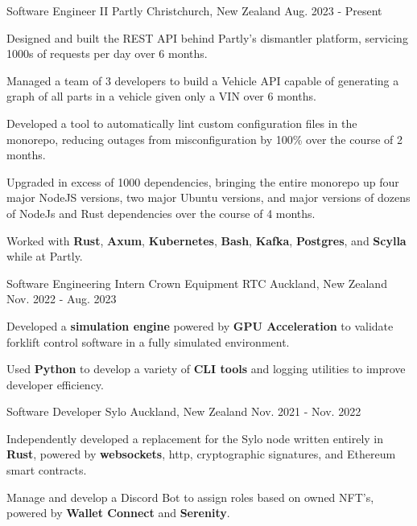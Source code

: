 
\begin{cventries}
  \cventry
    {Software Engineer II}
    {Partly}
    {Christchurch, New Zealand}
    {Aug. 2023 - Present}
    {
      \begin{cvitems}
        \item {Designed and built the REST API behind Partly's dismantler platform, servicing 1000s of requests per day over 6 months.}
        \item {Managed a team of 3 developers to build a Vehicle API capable of generating a graph of all parts in a vehicle given only a VIN over 6 months.}
        \item {Developed a tool to automatically lint custom configuration files in the monorepo, reducing outages from misconfiguration by 100\% over the course of 2 months.}
        \item {Upgraded in excess of 1000 dependencies, bringing the entire monorepo up four major NodeJS versions, two major Ubuntu versions, and major versions of dozens of NodeJs and Rust dependencies over the course of 4 months.}
        \item {Worked with \textbf{Rust}, \textbf{Axum}, \textbf{Kubernetes}, \textbf{Bash}, \textbf{Kafka}, \textbf{Postgres}, and \textbf{Scylla} while at Partly.}
      \end{cvitems}
    }

  \cventry
    {Software Engineering Intern}
    {Crown Equipment RTC}
    {Auckland, New Zealand}
    {Nov. 2022 - Aug. 2023}
    {
      \begin{cvitems}
        \item {Developed a \textbf{simulation engine} powered by \textbf{GPU Acceleration} to validate forklift control software in a fully simulated environment.}
        \item {Used \textbf{Python} to develop a variety of \textbf{CLI tools} and logging utilities to improve developer efficiency.}
      \end{cvitems}
    }

  \cventry
    {Software Developer} %
    {Sylo} %
    {Auckland, New Zealand} %
    {Nov. 2021 - Nov. 2022} %
    {
      \begin{cvitems} %
        \item {Independently developed a replacement for the Sylo node written entirely in \textbf{Rust}, powered by \textbf{websockets}, http, cryptographic signatures, and Ethereum smart contracts.}
        \item {Manage and develop a Discord Bot to assign roles based on owned NFT's, powered by \textbf{Wallet Connect} and \textbf{Serenity}.}
      \end{cvitems}
    }


\end{cventries}
